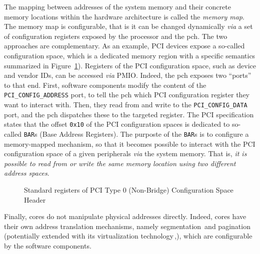 %
The mapping between addresses of the system memory and their concrete memory
locations within the hardware architecture is called the \emph{memory map}.
%
The memory map is configurable, that is it can be changed dynamically \emph{via}
a set of configuration registers exposed by the processor and the \ac{pch}.
%
The two approaches are complementary.
%
As an example, PCI devices expose a so-called configuration space, which is a
dedicated memory region with a specific semantics summarized in
Figure~\ref{fig:usecase:pciconfig}).
%
Registers of the PCI configuration space, such as device and vendor IDs, can be
accessed \emph{via} PMIO.
%
Indeed, the \ac{pch} exposes two ``ports'' to that end.
%
First, software components modify the content of the
\texttt{PCI\_CONFIG\_ADDRESS} port, to tell the \ac{pch} which PCI configuration
register they want to interact with.
%
Then, they read from and write to the \texttt{PCI\_CONFIG\_DATA} port, and the
\ac{pch} dispatches these \IO to the targeted register.
%
The PCI specification states that the offset \texttt{0x10} of the PCI
configuration spaces is dedicated to so-called \texttt{BAR}s (Base Address
Registers).
%
The purposte of the \texttt{BAR}s is to configure a memory-mapped mechanism, so
that it becomes possible to interact with the PCI configuration space of a given
peripherals \emph{via} the system memory.
%
That is, \emph{it is possible to read from or write the same memory location
  using two different address spaces}.

\begin{figure}
  \begin{center}
    \def\svgwidth{0.8\textwidth} \resizebox{0.6\textwidth}{!}{%
      }
  \end{center}
  \caption{Standard registers of PCI Type 0 (Non-Bridge) Configuration Space
    Header}
  \label{fig:usecase:pciconfig}
\end{figure}

Finally, cores do not manipulate physical addresses directly.
%
Indeed, cores have their own address translation mechanisms, namely
segmentation\,\cite[Volume 3, Section 2.4]{intel2014manual} and
pagination\,\cite[Volume 3, Chapter 4]{intel2014manual} (potentially extended
with its virtualization technology\,\cite[Volume 3, Section
28.2]{intel2014manual},), which are configurable by the software components.

